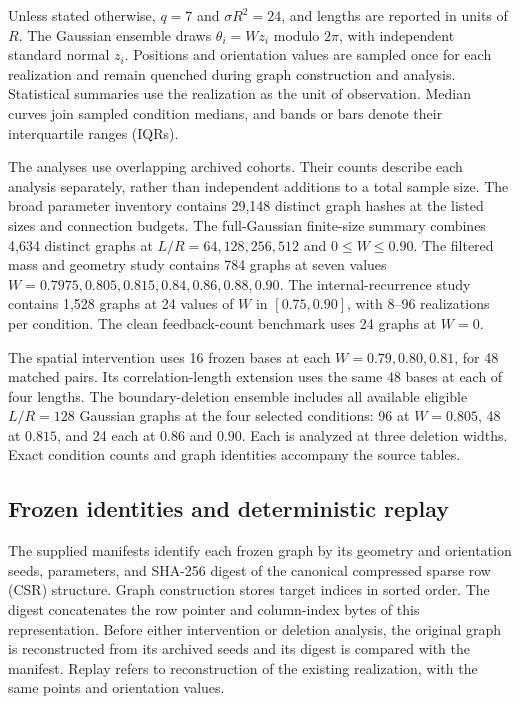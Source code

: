 \documentclass[11pt]{article}
\begin{document}
Unless stated otherwise, $q=7$ and $\sigma R^2=24$, and lengths are reported in units of $R$. The Gaussian ensemble draws $\theta_i=Wz_i$ modulo $2\pi$, with independent standard normal $z_i$. Positions and orientation values are sampled once for each realization and remain quenched during graph construction and analysis. Statistical summaries use the realization as the unit of observation. Median curves join sampled condition medians, and bands or bars denote their interquartile ranges (IQRs).

The analyses use overlapping archived cohorts. Their counts describe each analysis separately, rather than independent additions to a total sample size. The broad parameter inventory contains 29,148 distinct graph hashes at the listed sizes and connection budgets. The full-Gaussian finite-size summary combines 4,634 distinct graphs at $L/R=64,128,256,512$ and $0\leq W\leq0.90$. The filtered mass and geometry study contains 784 graphs at seven values $W=0.7975,0.805,0.815,0.84,0.86,0.88,0.90$. The internal-recurrence study contains 1,528 graphs at 24 values of $W$ in $[0.75,0.90]$, with 8--96 realizations per condition. The clean feedback-count benchmark uses 24 graphs at $W=0$.

The spatial intervention uses 16 frozen bases at each $W=0.79,0.80,0.81$, for 48 matched pairs. Its correlation-length extension uses the same 48 bases at each of four lengths. The boundary-deletion ensemble includes all available eligible $L/R=128$ Gaussian graphs at the four selected conditions: 96 at $W=0.805$, 48 at $0.815$, and 24 each at $0.86$ and $0.90$. Each is analyzed at three deletion widths. Exact condition counts and graph identities accompany the source tables.

\subsection{Frozen identities and deterministic replay}
The supplied manifests identify each frozen graph by its geometry and orientation seeds, parameters, and SHA-256 digest of the canonical compressed sparse row (CSR) structure. Graph construction stores target indices in sorted order. The digest concatenates the row pointer and column-index bytes of this representation. Before either intervention or deletion analysis, the original graph is reconstructed from its archived seeds and its digest is compared with the manifest. Replay refers to reconstruction of the existing realization, with the same points and orientation values.
\end{document}

